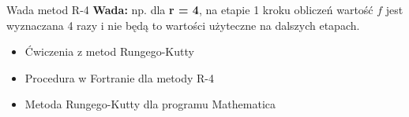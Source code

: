 \begin{frame}{Wada metod R-4}
	\textbf{Wada:} \quad np. dla \textbf{r = 4}, na etapie 1 kroku obliczeń wartość $f$ jest wyznaczana 4 razy i nie będą to wartości użyteczne na dalszych etapach.\newline\par
    \begin{itemize}
      \item Ćwiczenia z metod Rungego-Kutty
      \item Procedura w Fortranie dla metody R-4
      \item Metoda Rungego-Kutty dla programu Mathematica
    \end{itemize}
\end{frame}
